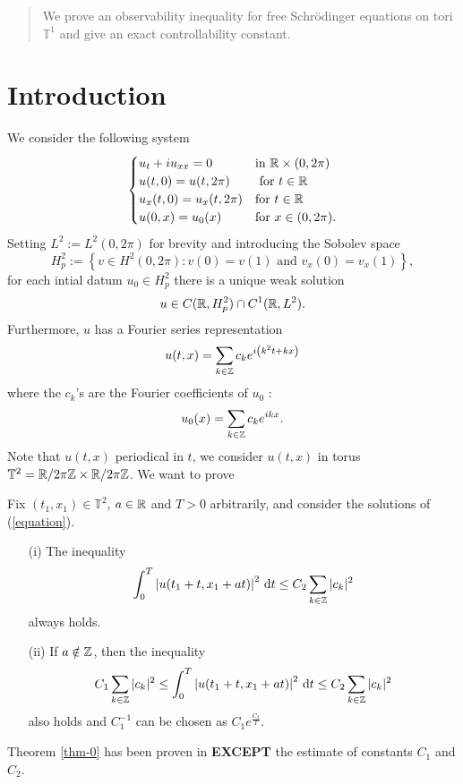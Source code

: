 \begin{abstract}
  We prove an observability inequality for free Schr\"{o}dinger equations on tori $\mathbb{T}^{1}$ and give an exact controllability constant.
\end{abstract}

\section{Introduction}
We consider the following system 
\begin{equation}\label{equation}
  \begin{cases}
    u_t+iu_{x x}=0 & \text{in }\mathbb{R}\times (0,2\pi)\\
    u(t,0)=u(t,2\pi) & \text{ for }t\in \mathbb{R}\\
    u_x(t,0)=u_x(t,2\pi) &\text{for }t\in \mathbb{R}\\
    u(0,x)=u_0(x) &\text{for }x\in (0,2\pi).
  \end{cases}
\end{equation}
Setting $L^2:=L^2(0,2\pi)$ for brevity and introducing the Sobolev space
\[
  H_p^2:=\left\{v\in H^2(0,2\pi):v(0)=v(1)\text{ and }v_x(0)=v_x(1)\right\}, 
\] 
for each intial datum $u_0 \in H^2_p$ there is a unique weak solution
\[
  u\in C(\mathbb{R},H^2_p)\cap C^{1}(\mathbb{R},L^2).
\] 
Furthermore, $u$ has a Fourier series representation
\begin{equation}
  u(t,x)=\sum_{k\in \mathbb{Z}} c_k e^{ i \left( k^2t+kx \right) }
\end{equation}
where the $c_k $'s are the Fourier coefficients of $u_0$ :
\[
  u_0(x)=\sum_{k\in \mathbb{Z}} c_ke ^{ikx}.
\]
Note that $u(t,x)$ periodical in $t$, we consider $u(t,x)$ in torus  $\mathbb{T}^2={\mathbb{R}} /{2\pi\mathbb{Z}}\times {\ensuremath{\mathbb{R}}} /{2\pi\mathbb{Z}}$.
We want to prove
\begin{theorem}\label{thm-0}
  Fix $(t_1,x_1) \in \mathbb{T}^2$, $a\in \mathbb{R}$ and $T>0$ arbitrarily, and consider the solutions of (\ref{equation}). 
  \begin{enumerate}
    \item [(i)]The inequality
      \begin{equation}
	\int_0^{T}\left| u(t_1+t,x_1+at) \right| ^2\,\mathrm{d} t\le C_2 \sum_{k\in \mathbb{Z}}^{} |c_k|^2
      \end{equation}
      always holds.
    \item [(ii)] If $a\notin  \mathbb{Z}$, then the inequality
      \begin{equation}
	C_1\sum_{k\in \mathbb{Z}}^{} |c_k|^2\le \int_0^{T}\left| u(t_1+t,x_1+at) \right| ^2\,\mathrm{d} t \le C_2 \sum_{k\in \mathbb{Z}}^{} |c_k|^2
      \end{equation}
      also holds and $C_1^{-1}$ can be chosen as $C_1e^{\frac{C_2}{T}}$.
  \end{enumerate}
\end{theorem}
\begin{remark}
  Theorem \ref{thm-0} has been proven in \cite{Jaming} \textbf{EXCEPT} the estimate of constants $C_1$ and $C_2$. 
\end{remark}
